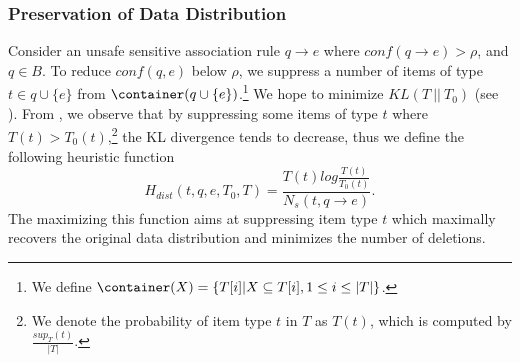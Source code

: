\vspace{-6mm}
\subsubsection{Preservation of Data Distribution}
Consider an unsafe sensitive association rule $q \rightarrow e$ where
$conf(q \rightarrow e) > \rho$, and $q \in B$.
To reduce $conf(q,e)$ below $\rho$,
we suppress a number of items of type $t\in q \cup \{e\}$ from
$\container(q\cup \{e\})$.\footnote{We define $\container(X)=\{T[i]|X\subseteq T[i], 1\le i\le |T|\}$.} We hope to minimize $KL(T ~||~ T_0)$
(see ).
From , we observe that by suppressing some items of type $t$
where $T(t)>T_0(t)$,\footnote{We denote the probability of item type $t$ in $T$
as $T(t)$, which is computed by $\frac{sup_T(t)}{|T|}$.}
the KL divergence tends to decrease, thus we define
the following heuristic function
\begin{equation}\label{eq:hdist}
H_{dist}(t, q, e, T_0, T) =
	\frac{T(t)log\frac{T(t)}{T_0(t)}}{N_s(t, q\rightarrow e)}.
\end{equation}
The maximizing this function aims at
suppressing item type $t$ which maximally recovers the original
data distribution and minimizes the number of deletions.


